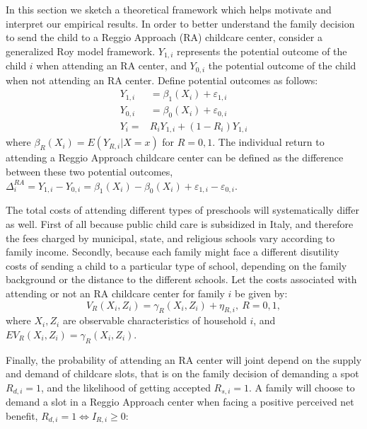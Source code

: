 \documentclass[12pt]{article}
\begin{document}
In this section we sketch a theoretical framework which helps motivate and interpret our empirical results. In order to better understand the family decision to send the child to a Reggio Approach (RA) childcare center, consider a generalized Roy model framework. $Y_{1,i}$ represents the potential outcome of the child $i$ when attending an RA center, and $Y_{0,i}$ the potential outcome of the child when not attending an RA center. Define potential outcomes as follows:
\begin{align}
Y_{1,i}& =\beta_{1}(X_{i})+\varepsilon_{1,i} \nonumber \\
Y_{0,i}& =\beta_{0}(X_{i})+\varepsilon_{0,i} \nonumber \\
Y_{i} =& R_{i}Y_{1,i} + (1-R_{i}) Y_{1,i} \label{eq:outcome}
\end{align}%
where $\beta_{R}(X_{i})=E(Y_{R,i}|X=x)$ for $R=0,1$. The individual return to attending a Reggio Approach childcare center can be defined as the difference between these two potential outcomes, $\Delta_{i}^{RA}=Y_{1,i}-Y_{0,i}=\beta_{1}(X_{i})-\beta_{0}(X_{i})+\varepsilon_{1,i}-\varepsilon_{0,i}$.

The total costs of attending different types of preschools will systematically differ as well. First of all because public child care is subsidized in Italy, and therefore the fees charged by municipal, state, and religious schools vary according to family income. %
Secondly, because each family might face a different disutility costs of sending a child to a particular type of school, depending on the family background or the distance to the different schools. 
Let the costs associated with attending or not an RA childcare center for family $i$ be given by:
\begin{equation*}
V_{R}(X_{i},Z_{i})=\gamma_{R}(X_{i},Z_{i})+\eta_{R,i},\ R=0,1,
\end{equation*}%
where $X_{i},Z_{i}$ are observable characteristics of household $i$, and $EV_{R}(X_{i},Z_{i})=\gamma_{R}(X_{i},Z_{i}).$

Finally, the probability of attending an RA center will joint depend on the supply and demand of childcare slots, that is on the family decision of demanding a spot $R_{d,i}=1$, and the likelihood of getting accepted $R_{s,i}=1$. 
A family will choose to demand a slot in a Reggio Approach center when facing a positive perceived net benefit, $R_{d,i}=1 \Leftrightarrow I_{R,i} \geq 0$:
\end{document}
